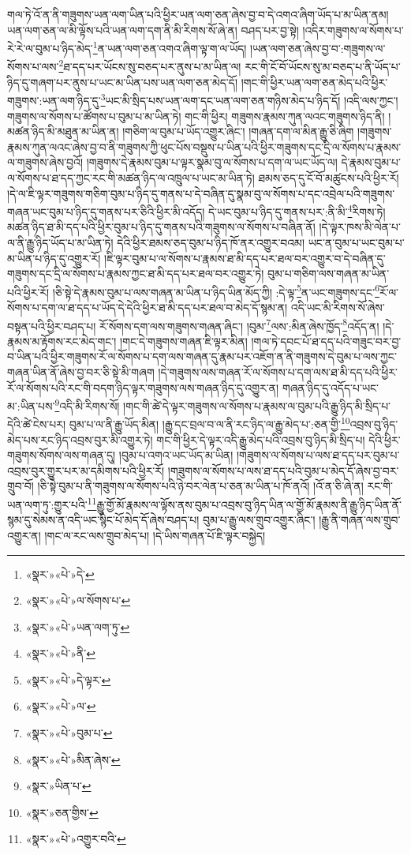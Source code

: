 གལ་ཏེ་འོ་ན་ནི་གཟུགས་ཡན་ལག་ཡིན་པའི་ཕྱིར་ཡན་ལག་ཅན་ཞེས་བྱ་བ་དེ་འགའ་ཞིག་ཡོད་པ་མ་ཡིན་ནམ། ཡན་ལག་ཅན་ལ་མི་ལྟོས་པའི་ཡན་ལག་དག་ནི་མི་རིགས་སོ་ཞེ་ན། བཤད་པར་བྱ་སྟེ། །འདིར་གཟུགས་ལ་སོགས་པ་རེ་རེ་ལ་བུམ་པ་ཉིད་མེད་\footnote{«སྣར་»«པེ་»དེ་}ན་ཡན་ལག་ཅན་འགའ་ཞིག་ལྟ་ག་ལ་ཡོད། །ཡན་ལག་ཅན་ཞེས་བྱ་བ་:གཟུགས་ལ་སོགས་པ་ལས་\footnote{«སྣར་»«པེ་»ལ་སོགས་པ་}ཐ་དད་པར་ཡོངས་སུ་བཅད་པར་ནུས་པ་མ་ཡིན་ལ། རང་གི་ངོ་བོ་ཡོངས་སུ་མ་བཅད་པ་ནི་ཡོད་པ་ཉིད་དུ་གཞག་པར་ནུས་པ་ཡང་མ་ཡིན་པས་ཡན་ལག་ཅན་མེད་དོ། །གང་གི་ཕྱིར་ཡན་ལག་ཅན་མེད་པའི་ཕྱིར་གཟུགས་:ཡན་ལག་ཉིད་དུ་\footnote{«སྣར་»«པེ་»ཡན་ལག་ཏུ་}ཡང་མི་སྲིད་པས་ཡན་ལག་དང་ཡན་ལག་ཅན་གཉིས་མེད་པ་ཉིད་དོ། །འདི་ལས་ཀྱང་། གཟུགས་ལ་སོགས་པ་ཚོགས་པ་བུམ་པ་མ་ཡིན་ཏེ། གང་གི་ཕྱིར། གཟུགས་རྣམས་ཀུན་ལའང་གཟུགས་ཉིད་ནི། །མཚན་ཉིད་མི་མཐུན་མ་ཡིན་ན། །གཅིག་ལ་བུམ་པ་ཡོད་འགྱུར་ཞིང་། །གཞན་དག་ལ་མིན་རྒྱུ་ཅི་ཞིག །གཟུགས་རྣམས་ཀུན་ལའང་ཞེས་བྱ་བ་ནི་གཟུགས་ཀྱི་ཕུང་པོས་བསྡུས་པ་ཡིན་པའི་ཕྱིར་གཟུགས་དང་དྲི་ལ་སོགས་པ་རྣམས་ལ་གཟུགས་ཞེས་བྱའོ། །གཟུགས་དེ་རྣམས་བུམ་པ་ལྟར་སྣམ་བུ་ལ་སོགས་པ་དག་ལ་ཡང་ཡོད་ལ། དེ་རྣམས་བུམ་པ་ལ་སོགས་པ་ཐ་དད་ཀྱང་རང་གི་མཚན་ཉིད་ལ་འཁྲུལ་པ་ཡང་མ་ཡིན་ཏེ། ཐམས་ཅད་དུ་ངོ་བོ་མཚུངས་པའི་ཕྱིར་རོ། །དེ་ལ་ཇི་ལྟར་གཟུགས་གཅིག་བུམ་པ་ཉིད་དུ་གནས་པ་དེ་བཞིན་དུ་སྣམ་བུ་ལ་སོགས་པ་དང་འབྲེལ་པའི་གཟུགས་གཞན་ཡང་བུམ་པ་ཉིད་དུ་གནས་པར་ཅིའི་ཕྱིར་མི་འདོད། དེ་ཡང་བུམ་པ་ཉིད་དུ་གནས་པར་:ནི་མི་\footnote{«སྣར་»«པེ་»ནི་}རིགས་ཏེ། མཚན་ཉིད་ཐ་མི་དད་པའི་ཕྱིར་བུམ་པ་ཉིད་དུ་གནས་པའི་གཟུགས་ལ་སོགས་པ་བཞིན་ནོ། །དེ་ལྟར་ཁས་མི་ལེན་པ་ལ་ནི་རྒྱུ་ཉིད་ཡོད་པ་མ་ཡིན་ཏེ། དེའི་ཕྱིར་ཐམས་ཅད་བུམ་པ་ཉིད་ཁོ་ནར་འགྱུར་བའམ། ཡང་ན་བུམ་པ་ཡང་བུམ་པ་མ་ཡིན་པ་ཉིད་དུ་འགྱུར་རོ། །ཇི་ལྟར་བུམ་པ་ལ་སོགས་པ་རྣམས་ཐ་མི་དད་པར་ཐལ་བར་འགྱུར་བ་དེ་བཞིན་དུ་གཟུགས་དང་དྲི་ལ་སོགས་པ་རྣམས་ཀྱང་ཐ་མི་དད་པར་ཐལ་བར་འགྱུར་ཏེ། བུམ་པ་གཅིག་ལས་གཞན་མ་ཡིན་པའི་ཕྱིར་རོ། །ཅི་སྟེ་དེ་རྣམས་བུམ་པ་ལས་གཞན་མ་ཡིན་པ་ཉིད་ཡིན་མོད་ཀྱི། :དེ་ལྟ་\footnote{«སྣར་»«པེ་»དེ་ལྟར་}ན་ཡང་གཟུགས་དང་\footnote{«སྣར་»«པེ་»ལ་}རོ་ལ་སོགས་པ་དག་ལ་ཐ་དད་པ་ཡོད་དེ་དེའི་ཕྱིར་ཐ་མི་དད་པར་ཐལ་བ་མེད་དོ་སྙམ་ན། འདི་ཡང་མི་རིགས་སོ་ཞེས་བསྟན་པའི་ཕྱིར་བཤད་པ། རོ་སོགས་དག་ལས་གཟུགས་གཞན་ཞིང་། །བུམ་\footnote{«སྣར་»«པེ་»བུམ་པ་}ལས་:མིན་ཞེས་ཁྱོད་\footnote{«སྣར་»«པེ་»མིན་ཞེས་}འདོད་ན། །དེ་རྣམས་མ་རྟོགས་རང་མེད་གང་། །གང་དེ་གཟུགས་གཞན་ཇི་ལྟར་མིན། །གལ་ཏེ་དབང་པོ་ཐ་དད་པའི་གཟུང་བར་བྱ་བ་ཡིན་པའི་ཕྱིར་གཟུགས་རོ་ལ་སོགས་པ་དག་ལས་གཞན་དུ་རྣམ་པར་འཇོག་ན་ནི་གཟུགས་དེ་བུམ་པ་ལས་ཀྱང་གཞན་ཡིན་ནོ་ཞེས་བྱ་བར་ཅི་སྟེ་མི་གཞག །དེ་གཟུགས་ལས་གཞན་རོ་ལ་སོགས་པ་དག་ལས་ཐ་མི་དད་པའི་ཕྱིར་རོ་ལ་སོགས་པའི་རང་གི་བདག་ཉིད་ལྟར་གཟུགས་ལས་གཞན་ཉིད་དུ་འགྱུར་ན། གཞན་ཉིད་དུ་འདོད་པ་ཡང་མ་:ཡིན་པས་\footnote{«སྣར་»ཡིན་པ་}འདི་མི་རིགས་སོ། །གང་གི་ཚེ་དེ་ལྟར་གཟུགས་ལ་སོགས་པ་རྣམས་ལ་བུམ་པའི་རྒྱུ་ཉིད་མི་སྲིད་པ་དེའི་ཚེ་ངེས་པར། བུམ་པ་ལ་ནི་རྒྱུ་ཡོད་མིན། །རྒྱུ་དང་བྲལ་བ་ལ་ནི་རང་ཉིད་ལ་རྒྱུ་མེད་པ་:ཅན་གྱི་\footnote{«སྣར་»ཅན་གྱིས་}འབྲས་བུ་ཉིད་མེད་པས་རང་ཉིད་འབྲས་བུར་མི་འགྱུར་ཏེ། གང་གི་ཕྱིར་དེ་ལྟར་འདི་རྒྱུ་མེད་པའི་འབྲས་བུ་ཉིད་མི་སྲིད་པ། དེའི་ཕྱིར་གཟུགས་སོགས་ལས་གཞན་དུ། །བུམ་པ་འགའ་ཡང་ཡོད་མ་ཡིན། །གཟུགས་ལ་སོགས་པ་ལས་ཐ་དད་པར་བུམ་པ་འབྲས་བུར་གྱུར་པར་མ་དམིགས་པའི་ཕྱིར་རོ། །གཟུགས་ལ་སོགས་པ་ལས་ཐ་དད་པའི་བུམ་པ་མེད་དོ་ཞེས་བྱ་བར་གྲུབ་བོ། །ཅི་སྟེ་བུམ་པ་ནི་གཟུགས་ལ་སོགས་པའི་ཉེ་བར་ལེན་པ་ཅན་མ་ཡིན་པ་ཁོ་ནའོ། །འོ་ན་ཅི་ཞེ་ན། རང་གི་ཡན་ལག་ཏུ་:གྱུར་པའི་\footnote{«སྣར་»«པེ་»འགྱུར་བའི་}རྒྱུ་གྱོ་མོ་རྣམས་ལ་ལྟོས་ནས་བུམ་པ་འབྲས་བུ་ཉིད་ཡིན་ལ་གྱོ་མོ་རྣམས་ནི་རྒྱུ་ཉིད་ཡིན་ནོ་སྙམ་དུ་སེམས་ན་འདི་ཡང་སྙིང་པོ་མེད་དོ་ཞེས་བཤད་པ། བུམ་པ་རྒྱུ་ལས་གྲུབ་འགྱུར་ཞིང་། །རྒྱུ་ནི་གཞན་ལས་གྲུབ་འགྱུར་ན། །གང་ལ་རང་ལས་གྲུབ་མེད་པ། །དེ་ཡིས་གཞན་པོ་ཇི་ལྟར་བསྐྱེད། 